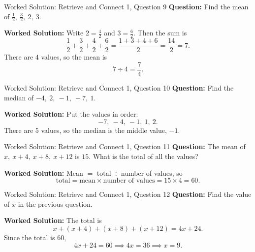 \documentclass{beamer}
\begin{document}
\begin{frame}{Worked Solution: Retrieve and Connect 1, Question 9}
\small
\textbf{Question:} Find the mean of \(\frac{1}{2},\ \frac{3}{2},\ 2,\ 3\).

\smallskip
\textbf{Worked Solution:} Write \(2=\frac42\) and \(3=\frac62\). Then the sum is
\[
\frac12+\frac32+\frac42+\frac62=\frac{1+3+4+6}{2}=\frac{14}{2}=7.
\]
There are \(4\) values, so the mean is
\[
7 \div 4 = \frac74.
\]
\end{frame}

\begin{frame}{Worked Solution: Retrieve and Connect 1, Question 10}
\small
\textbf{Question:} Find the median of \(-4,\ 2,\ -1,\ -7,\ 1\).

\smallskip
\textbf{Worked Solution:} Put the values in order:
\[
-7,\ -4,\ -1,\ 1,\ 2.
\]
There are \(5\) values, so the median is the middle value, \(-1\).
\end{frame}

\begin{frame}{Worked Solution: Retrieve and Connect 1, Question 11}
\small
\textbf{Question:} The mean of \(x,\ x+4,\ x+8,\ x+12\) is \(15\). What is the total of all the values?

\smallskip
\textbf{Worked Solution:} Mean \(=\) total \(\div\) number of values, so
\[
\text{total}=\text{mean}\times\text{number of values}=15\times4=60.
\]
\end{frame}

\begin{frame}{Worked Solution: Retrieve and Connect 1, Question 12}
\small
\textbf{Question:} Find the value of \(x\) in the previous question.

\smallskip
\textbf{Worked Solution:} The total is
\[
x+(x+4)+(x+8)+(x+12)=4x+24.
\]
Since the total is \(60\),
\[
4x+24=60 \implies 4x=36 \implies x=9.
\]
\end{frame}
\end{document}

